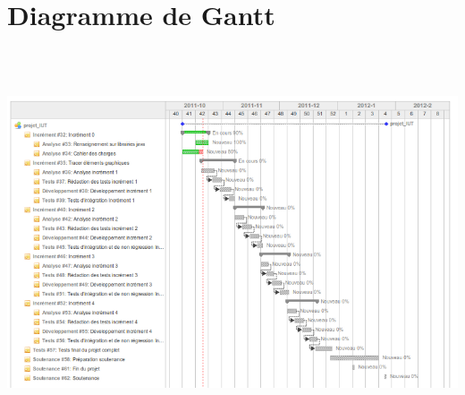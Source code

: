 \documentclass[12pt,a4paper,openany]{article}
\begin{document}
\section{Diagramme de Gantt}
\label{gantt}
\hspace{20px}
\vspace{-330px}
\includegraphics[height=430px, angle=-90]{projetiut-gantt.png}

%
\end{document}
